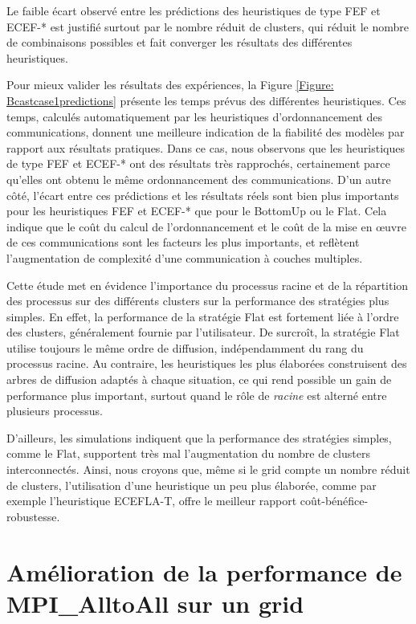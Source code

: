 Le faible écart observé entre les prédictions des heuristiques de
type FEF et ECEF-{*} est justifié surtout par le nombre réduit de
clusters, qui réduit le nombre de combinaisons possibles et fait converger
les résultats des différentes heuristiques. 

Pour mieux valider les résultats des expériences, la Figure \ref{Figure: Bcastcase1predictions}
présente les temps prévus des différentes heuristiques. Ces temps,
calculés automatiquement par les heuristiques d'ordonnancement des
communications, donnent une meilleure indication de la fiabilité des
modèles par rapport aux résultats pratiques. Dans ce cas, nous observons
que les heuristiques de type FEF et ECEF-{*} ont des résultats très
rapprochés, certainement parce qu'elles ont obtenu le même ordonnancement
des communications. D'un autre côté, l'écart entre ces prédictions
et les résultats réels sont bien plus importants pour les heuristiques
FEF et ECEF-{*} que pour le BottomUp ou le Flat. Cela indique que
le coût du calcul de l'ordonnancement et le coût de la mise en {\oe}uvre
de ces communications sont les facteurs les plus importants, et reflètent
l'augmentation de complexité d'une communication à couches multiples.

Cette étude met en évidence l'importance
du processus racine et de la répartition des processus sur des différents
clusters sur la performance des stratégies plus simples. En effet,
la performance de la stratégie Flat est fortement liée à l'ordre des clusters, généralement fournie par l'utilisateur.
De surcroît, la stratégie Flat utilise toujours le même ordre de diffusion,
indépendamment du rang du processus racine. Au contraire, les heuristiques
les plus élaborées construisent des arbres de diffusion adaptés à
chaque situation, ce qui rend possible un gain de performance plus
important, surtout quand le rôle de \emph{racine} est alterné entre
plusieurs processus.

D'ailleurs, les simulations indiquent que la performance des stratégies
simples, comme le Flat, supportent très mal l'augmentation du nombre
de clusters interconnectés.  Ainsi, nous croyons que, même si
le grid compte un nombre réduit de clusters, l'utilisation d'une
heuristique un peu plus élaborée, comme par exemple l'heuristique
ECEFLA-T, offre le meilleur rapport coût-bénéfice-robustesse.


\section{Amélioration de la performance de MPI\_AlltoAll sur un grid}

